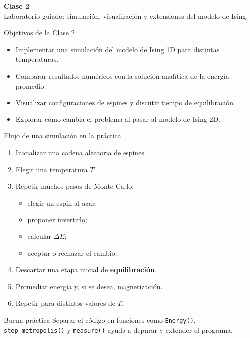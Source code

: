 \begin{frame}[plain]
\centering
\vfill
{\Huge \bfseries Clase 2}\\[0.4cm]
{\Large Laboratorio guiado: simulación, visualización y extensiones del modelo de Ising}
\vfill
\end{frame}

\begin{frame}{Objetivos de la Clase 2}
\begin{itemize}
    \item Implementar una simulación del modelo de Ising 1D para distintas temperaturas.
    \item Comparar resultados numéricos con la solución analítica de la energía promedio.
    \item Visualizar configuraciones de espines y discutir tiempo de equilibración.
    \item Explorar cómo cambia el problema al pasar al modelo de Ising 2D.
\end{itemize}
\end{frame}

\begin{frame}{Flujo de una simulación en la práctica}
\small
\begin{enumerate}
    \item Inicializar una cadena aleatoria de espines.
    \item Elegir una temperatura $T$.
    \item Repetir muchos pasos de Monte Carlo:
    \begin{itemize}
        \item elegir un espín al azar;
        \item proponer invertirlo;
        \item calcular $\Delta E$;
        \item aceptar o rechazar el cambio.
    \end{itemize}
    \item Descartar una etapa inicial de \textbf{equilibración}.
    \item Promediar energía y, si se desea, magnetización.
    \item Repetir para distintos valores de $T$.
\end{enumerate}

\begin{block}{Buena práctica}
Separar el código en funciones como \texttt{Energy()}, \texttt{step\_metropolis()} y \texttt{measure()} ayuda a depurar y extender el programa.
\end{block}
\end{frame}

